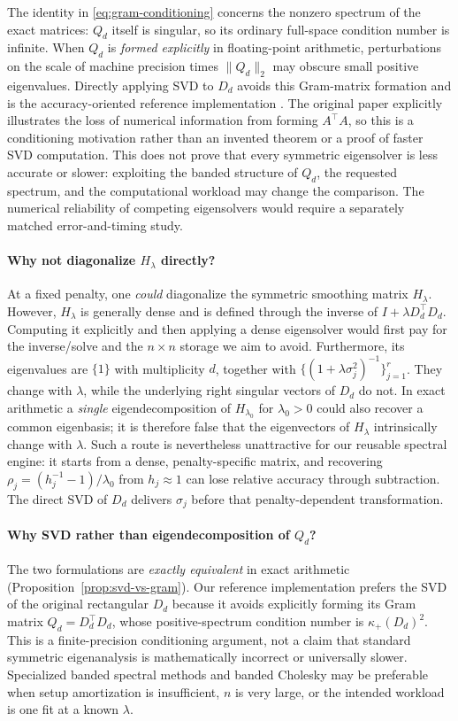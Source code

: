The identity in \eqref{eq:gram-conditioning} concerns the nonzero
spectrum of the exact matrices: $Q_d$ itself is singular, so its
ordinary full-space condition number is infinite. When $Q_d$ is
\emph{formed explicitly} in floating-point arithmetic, perturbations
on the scale of machine precision times $\|Q_d\|_2$ may obscure small
positive eigenvalues. Directly applying SVD to $D_d$ avoids this
Gram-matrix formation and is the accuracy-oriented reference
implementation \citep[p.~404]{golubreinsch1970}. The original paper explicitly illustrates the loss of numerical information from forming $A^\top A$, so this is a conditioning motivation rather than an invented theorem or a proof of faster SVD computation.
This does not prove that every symmetric eigensolver is less accurate
or slower: exploiting the banded structure of $Q_d$, the requested
spectrum, and the computational workload may change the comparison.
The numerical reliability of competing eigensolvers would require
a separately matched error-and-timing study.

\paragraph{Why not diagonalize $H_\lambda$ directly?}
At a fixed penalty, one \emph{could} diagonalize the symmetric
smoothing matrix $H_\lambda$. However, $H_\lambda$ is generally
dense and is defined through the inverse of
$I+\lambda D_d^\top D_d$. Computing it explicitly and then applying
a dense eigensolver would first pay for the inverse/solve and the
$n\times n$ storage we aim to avoid. Furthermore, its eigenvalues
are $\{1\}$ with multiplicity $d$, together with
$\{(1+\lambda\sigma_j^2)^{-1}\}_{j=1}^r$.
They change with $\lambda$, while the underlying right
singular vectors of $D_d$ do not. In exact arithmetic a
\emph{single} eigendecomposition of $H_{\lambda_0}$ for
$\lambda_0>0$ could also recover a common eigenbasis;
it is therefore false that the eigenvectors of $H_\lambda$
intrinsically change with $\lambda$. Such a route is nevertheless
unattractive for our reusable spectral engine:
it starts from a dense, penalty-specific matrix, and recovering
$\rho_j=(h_j^{-1}-1)/\lambda_0$ from $h_j\approx1$ can lose
relative accuracy through subtraction. The direct SVD of $D_d$
delivers $\sigma_j$ before that penalty-dependent transformation.

\paragraph{Why SVD rather than eigendecomposition of $Q_d$?}
The two formulations are \emph{exactly equivalent} in exact
arithmetic (Proposition~\ref{prop:svd-vs-gram}).
Our reference implementation prefers the SVD of the
original rectangular $D_d$ because it avoids explicitly
forming its Gram matrix $Q_d=D_d^\top D_d$, whose
positive-spectrum condition number is
$\kappa_+(D_d)^2$. This is a finite-precision conditioning
argument, not a claim that standard symmetric eigenanalysis
is mathematically incorrect or universally slower.
Specialized banded spectral methods and banded Cholesky
may be preferable when setup amortization is insufficient,
$n$ is very large, or the intended workload is one fit
at a known $\lambda$.

